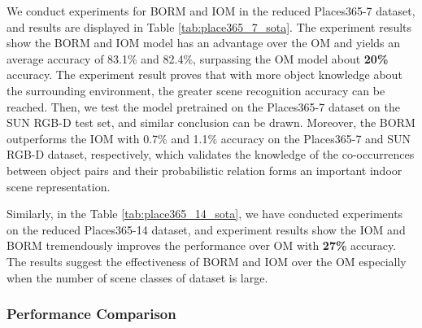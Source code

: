 We conduct experiments for BORM and IOM in the reduced Places365-7 dataset, and results are displayed in Table \ref{tab:place365_7_sota}. The experiment results show the BORM and IOM model has an advantage over the OM and yields an average accuracy of 83.1\% and 82.4\%, surpassing the OM model about \textbf{20\%} accuracy. The experiment result proves that with more object knowledge about the surrounding environment, the greater scene recognition accuracy can be reached.  Then, we test the model pretrained on the Places365-7 dataset on the SUN RGB-D test set, and similar conclusion can be drawn. Moreover, the BORM outperforms the IOM with 0.7\% and 1.1\% accuracy on the Places365-7 and SUN RGB-D dataset, respectively, which validates the knowledge of the co-occurrences between object pairs and their probabilistic relation forms an important indoor scene representation.


Similarly, in the Table \ref{tab:place365_14_sota}, we have conducted experiments on the reduced Places365-14 dataset, and experiment results show the IOM and BORM tremendously improves the performance over OM with \textbf{27\%} accuracy. The results suggest the effectiveness of BORM and IOM over the OM especially when the number of scene classes of dataset is large.



\subsubsection{Performance Comparison}


